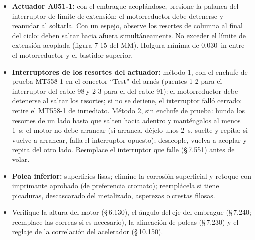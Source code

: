 \begin{itemize}
\item \textbf{Actuador A051-1:} con el embrague acoplándose, presione la palanca del interruptor de límite de extensión: el motorreductor debe detenerse y reanudar al soltarla. Con un espejo, observe los resortes de columna al final del ciclo: deben saltar hacia afuera simultáneamente. No exceder el límite de extensión acoplada (figura 7-15 del MM). Holgura mínima de 0,030~in entre el motorreductor y el bastidor superior.
\item \textbf{Interruptores de los resortes del actuador:} método 1, con el enchufe de prueba MT558-1 en el conector ``Test'' del arnés (puentes 1-2 para el interruptor del cable 98 y 2-3 para el del cable 91): el motorreductor debe detenerse al saltar los resortes; si no se detiene, el interruptor falló cerrado: retire el MT558-1 de inmediato. Método 2, sin enchufe de prueba: hunda los resortes de un lado hasta que salten hacia adentro y manténgalos al menos 1~s; el motor no debe arrancar (si arranca, déjelo unos 2~s, suelte y repita: si vuelve a arrancar, falla el interruptor opuesto); desacople, vuelva a acoplar y repita del otro lado. Reemplace el interruptor que falle (\S\,7.551) antes de volar.
\item \textbf{Polea inferior:} superficies lisas; elimine la corrosión superficial y retoque con imprimante aprobado (de preferencia cromato); reemplácela si tiene picaduras, descascarado del metalizado, asperezas o crestas filosas.
\item Verifique la altura del motor (\S\,6.130), el ángulo del eje del embrague (\S\,7.240; reemplace las correas si es necesario), la alineación de poleas (\S\,7.230) y el reglaje de la correlación del acelerador (\S\,10.150).
\end{itemize}

